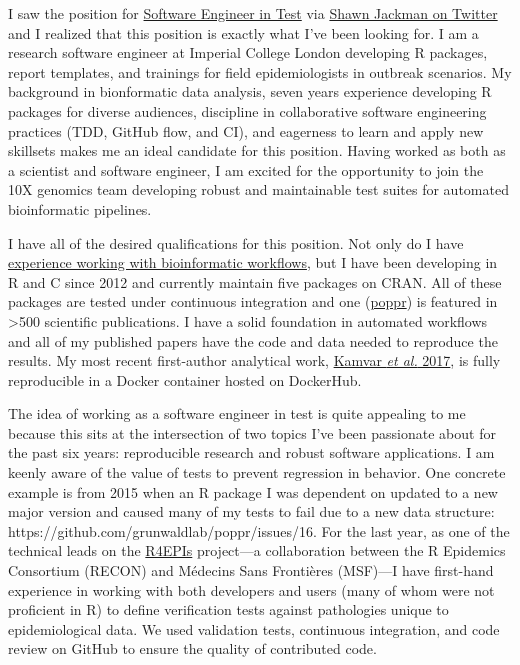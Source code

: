 I saw the position for
\href{https://boards.greenhouse.io/10xgenomics/jobs/1769868?gh_jid=1769868#application}{Software
Engineer in Test} via
\href{https://twitter.com/sjackman/status/1189977010908454912?s=20}{Shawn
Jackman on Twitter} and I realized that this position is exactly what I've been
looking for. I am a research software engineer at Imperial College London
developing R packages, report templates, and trainings for field
epidemiologists in outbreak scenarios. My background in bionformatic data
analysis, seven years experience developing R packages for diverse audiences,
discipline in collaborative software engineering practices (TDD, GitHub flow,
and CI), and eagerness to learn and apply new skillsets makes me an ideal
candidate for this position. Having worked as both as a scientist and software
engineer, I am excited for the opportunity to join the 10X genomics team
developing robust and maintainable test suites for automated bioinformatic
pipelines.

\vspace{1ex}

I have all of the desired qualifications for this position. Not only do I have
\href{https://github.com/zkamvar/read-processing}{experience working with 
bioinformatic workflows}, but I have been developing in R and C since 2012
and currently maintain five packages on CRAN. All of these packages are tested
under continuous integration and one
(\href{https://grunwaldlab.github.io/poppr}{poppr}) is featured in
\textgreater500 scientific publications. I have a solid foundation in automated
workflows and all of my published papers have the code and data needed to
reproduce the results. My most recent first-author analytical work,
\href{https://peerj.com/articles/4152/}{Kamvar \textit{et al.} 2017}, is fully
reproducible in a Docker container hosted on DockerHub.

\vspace{1ex}

The idea of working as a software engineer in test is quite appealing to me
because this sits at the intersection of two topics I've been passionate about
for the past six years: reproducible research and robust software applications.
I am keenly aware of the value of tests to prevent regression in behavior. One
concrete example is from 2015 when an R package I was dependent on updated to
a new major version and caused many of my tests to fail due to a new data
structure: https://github.com/grunwaldlab/poppr/issues/16.  For the last year,
as one of the technical leads on the \href{https://r4epis.netlify.com}{R4EPIs}
project---a collaboration between the R Epidemics Consortium (RECON) and
M\'{e}decins Sans Fronti\`{e}res (MSF)---I have first-hand experience in
working with both developers and users (many of whom were not proficient in R)
to define verification tests against pathologies unique to epidemiological
data. We used validation tests, continuous integration, and code review on
GitHub to ensure the quality of contributed code.

